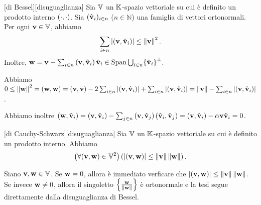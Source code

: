 \begin{Theorem}
	[di Bessel][disuguaglianza]
  Sia $\mathbb{V}$ un $\mathbb{K}$-spazio vettoriale su cui \`e definito un
  prodotto interno $\left ( \cdot , \cdot \right )$.
  Sia $(\hat{\mathbf{v}}_i)_{i \in n}$ ($n \in \mathbb{N}$) una famiglia di
  vettori ortonormali. Per ogni $\mathbf{v} \in \mathbb{V}$, abbiamo
  \[
    \sum_{i \in n}
      \AbsoluteValue{\InnerProduct{\Vector}{\OrthonormalBase_i}}
      \leq \Norm{\Vector}^2.
  \]
  Inoltre,
  $\mathbf{w} =
    \mathbf{v}
    -\sum_{i \in n}\left ( \mathbf{v} , \hat{\mathbf{v}}_i \right ) \hat{\mathbf{v}}_i
    \in {
      \operatorname{\operatorname{Span}}{\bigcup_{i \in n} \lbrace \hat{\mathbf{v}}_i \rbrace}}^\perp$.
\end{Theorem}
\Proof Abbiamo $0 \leq \Norm{\VarVector}^2 = \InnerProduct{\VarVector}{\VarVector} = \InnerProduct{\Vector}{\Vector} - 2 \sum_{i \in n} \AbsoluteValue{\InnerProduct{\Vector}{\OrthonormalBase_i}} + \sum_{i \in n} \AbsoluteValue{\InnerProduct{\Vector}{\OrthonormalBase_i}} = \Norm{\Vector} - \sum_{i \in n} \AbsoluteValue{\InnerProduct{\Vector}{\OrthonormalBase_i}}$.
\par Abbiamo inoltre $\left ( \mathbf{w} , \hat{\mathbf{v}}_i \right ) = \left ( \mathbf{v} , \hat{\mathbf{v}}_i \right ) - \sum_{j \in n}\left ( \mathbf{v} , \hat{\mathbf{v}}_j \right )\left ( \hat{\mathbf{v}}_i , \hat{\mathbf{v}}_j \right ) = \left ( \mathbf{v} , \hat{\mathbf{v}}_i \right ) - \alpha{\mathbf{v}}{\hat{\mathbf{v}}_i} = 0$. \EndProof
\begin{Corollary}
	[di Cauchy-Schwarz][disuguaglianza]
  Sia $\mathbb{V}$ un $\mathbb{K}$-spazio vettoriale su cui \`e definito un
  prodotto interno. Abbiamo
  \[
    \ForAll{(\Vector,\VarVector) \in \LinearSpace^2}
      {\AbsoluteValue{\InnerProduct{\Vector}{\VarVector}}
      \leq \Norm{\Vector}\Norm{\VarVector}}.
  \]
\end{Corollary}
\Proof Siano $\mathbf{v}, \mathbf{w} \in \mathbb{V}$. Se $\mathbf{w} = 0$, allora
\`e immediato verficare che
$\AbsoluteValue{\InnerProduct{\Vector}{\VarVector}}
\leq \Norm{\Vector}\Norm{\VarVector}$. Se invece $\mathbf{w} \neq 0$, allora il
singoletto $\left \lbrace \frac{\VarVector}{\Norm{\VarVector}} \right \rbrace$
\`e ortonormale e la tesi segue direttamente dalla disuguaglianza di Bessel.
\EndProof
